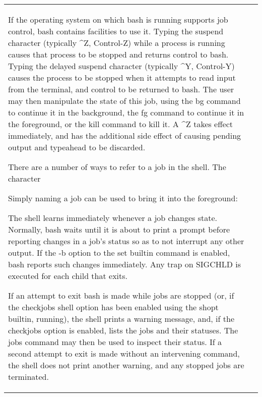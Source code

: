 \documentclass[11pt]{article}
\begin{document}
\begin{longtable}{p{}p{}}
{{{If the operating system on which bash is running supports job control, bash contains facilities to use it. Typing the suspend character (typically ^Z, Control-Z) while a process is running causes that process to be stopped and returns control to bash. Typing the delayed suspend character (typically ^Y, Control-Y) causes the process to be stopped when it attempts to read input from the terminal, and control to be returned to bash. The user may then manipulate the state of this job, using the bg command to continue it in the background, the fg command to continue it in the foreground, or the kill command to kill it. A ^Z takes effect immediately, and has the additional side effect of causing pending output and typeahead to be discarded.

There are a number of ways to refer to a job in the shell. The character %

Simply naming a job can be used to bring it into the foreground: %

The shell learns immediately whenever a job changes state. Normally, bash waits until it is about to print a prompt before reporting changes in a job's status so as to not interrupt any other output. If the -b option to the set builtin command is enabled, bash reports such changes immediately. Any trap on SIGCHLD is executed for each child that exits.

If an attempt to exit bash is made while jobs are stopped (or, if the checkjobs shell option has been enabled using the shopt builtin, running), the shell prints a warning message, and, if the checkjobs option is enabled, lists the jobs and their statuses. The jobs command may then be used to inspect their status. If a second attempt to exit is made without an intervening command, the shell does not print another warning, and any stopped jobs are terminated.

}}}
\end{longtable}
\end{document}
